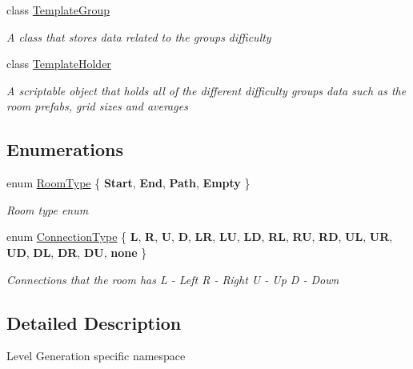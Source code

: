 \begin{DoxyCompactItemize}
class \mbox{\hyperlink{class_level_generation_1_1_template_group}{Template\+Group}}
\begin{DoxyCompactList}\small\item\em A class that stores data related to the groups difficulty \end{DoxyCompactList}\item 
class \mbox{\hyperlink{class_level_generation_1_1_template_holder}{Template\+Holder}}
\begin{DoxyCompactList}\small\item\em A scriptable object that holds all of the different difficulty groups data such as the room prefabs, grid sizes and averages \end{DoxyCompactList}\end{DoxyCompactItemize}
\subsection*{Enumerations}
\begin{DoxyCompactItemize}
\item 
enum \mbox{\hyperlink{namespace_level_generation_a206451e0c8bfced86ae4b9348cd3718f}{Room\+Type}} \{ {\bfseries Start}, 
{\bfseries End}, 
{\bfseries Path}, 
{\bfseries Empty}
 \}
\begin{DoxyCompactList}\small\item\em Room type enum \end{DoxyCompactList}\item 
enum \mbox{\hyperlink{namespace_level_generation_ac48934e101078b19dce3479d82f689e0}{Connection\+Type}} \{ \newline
{\bfseries L}, 
{\bfseries R}, 
{\bfseries U}, 
{\bfseries D}, 
\newline
{\bfseries LR}, 
{\bfseries LU}, 
{\bfseries LD}, 
{\bfseries RL}, 
\newline
{\bfseries RU}, 
{\bfseries RD}, 
{\bfseries UL}, 
{\bfseries UR}, 
\newline
{\bfseries UD}, 
{\bfseries DL}, 
{\bfseries DR}, 
{\bfseries DU}, 
\newline
{\bfseries none}
 \}
\begin{DoxyCompactList}\small\item\em Connections that the room has L -\/ Left R -\/ Right U -\/ Up D -\/ Down \end{DoxyCompactList}\end{DoxyCompactItemize}


\subsection{Detailed Description}
Level Generation specific namespace 



